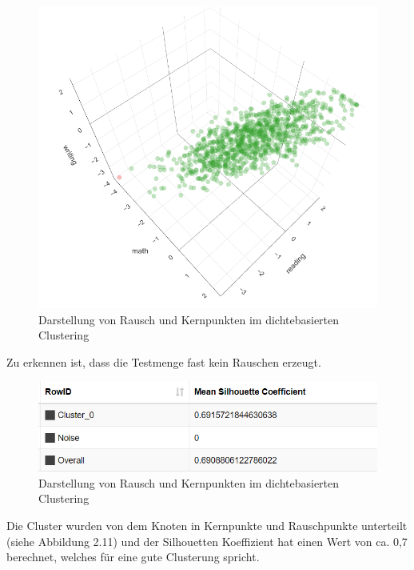 \documentclass[12pt,					%
							 oneside,			%
							 a4paper,			%
							 halfparskip,		%
							 liststotoc,			%
							 bibtotoc,			%
							 fleqn,				%
							 pointlessnumbers]	%
							 {scrreprt}
\begin{document}
		\begin{figure}[!h]
			\begin{center}
				\includegraphics[scale=0.5]{pictures/plotly_dense.png}
				\caption{Darstellung von Rausch und Kernpunkten im dichtebasierten Clustering}
			\end{center}
		\end{figure}
		
		Zu erkennen ist, dass die Testmenge fast kein Rauschen erzeugt. 
		
		\begin{figure}[!h]
			\begin{center}
				\includegraphics[scale=0.7]{pictures/sil_dens.png}
				\caption{Darstellung von Rausch und Kernpunkten im dichtebasierten Clustering}
			\end{center}
		\end{figure}
		
		Die Cluster wurden von dem Knoten in Kernpunkte und Rauschpunkte unterteilt (siehe Abbildung 2.11) und der Silhouetten Koeffizient hat einen Wert von ca. 0,7 berechnet, welches für eine gute Clusterung spricht. 
		
\end{document}
